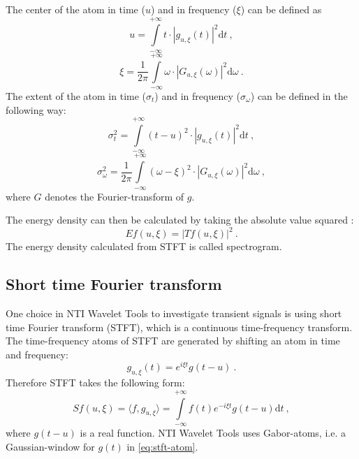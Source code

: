 \documentclass[a4paper,12pt,oneside]{article}
\newcommand{\dt}{\mathrm{d}t}
\newcommand{\dw}{\mathrm{d}\omega}
\begin{document}
The center of the atom in time ($u$) and in frequency ($\xi$) can be defined as
	\begin{equation*}
	u = \int\limits_{-\infty}^{+\infty} t \cdot |g_{u, \xi}(t)|^2 \dt\ ,
	\end{equation*}
	\begin{equation*}
	\xi = \frac{1}{2\pi} \int\limits_{-\infty}^{+\infty} \omega \cdot |G_{u, \xi}(\omega)|^2 \dw\ .
	\end{equation*}
The extent of the atom in time ($\sigma_t$) and in frequency ($\sigma_{\omega}$) can be defined in the following way:
	\begin{equation*}
	\sigma_t^2 = \int\limits_{-\infty}^{+\infty} (t-u)^2 \cdot |g_{u, \xi}(t)|^2 \dt\ ,
	\end{equation*}
	\begin{equation*}
	\sigma_{\omega}^2 = \frac{1}{2\pi} \int\limits_{-\infty}^{+\infty} (\omega-\xi)^2 \cdot |G_{u, \xi}(\omega)|^2 \dw\ ,
	\end{equation*}
where $G$ denotes the Fourier-transform of $g$.

The energy density can then be calculated by taking the absolute value squared \cite{mallat08wavelet}:
\begin{equation}\label{eq:energy_density}
  E f(u,\xi) = |T f(u,\xi)|^2\ .
\end{equation}
The energy density calculated from STFT is called spectrogram.

\subsection{Short time Fourier transform}

One choice in NTI Wavelet Tools to investigate transient signals is using short time Fourier transform\cite{mallat08wavelet} (STFT), which is a continuous time-frequency transform. The time-frequency atoms of STFT are generated by shifting an atom in time and frequency:
\begin{equation}\label{eq:stft-atom}
  g_{u,\xi}(t) = e^{i\xi t} g(t-u) \ .
\end{equation}
Therefore STFT takes the following form:
\begin{equation}\label{eq:stft}
  S f(u,\xi) = \langle f, g_{u, \xi} \rangle = \int\limits_{-\infty}^{+\infty} f(t) e^{-i \xi t} g(t-u) \dt \ ,
\end{equation}
where $g(t-u)$ is a real function. NTI Wavelet Tools uses Gabor-atoms, i.e. a Gaussian-window for $g(t)$ in \eqref{eq:stft-atom}.
\end{document}

